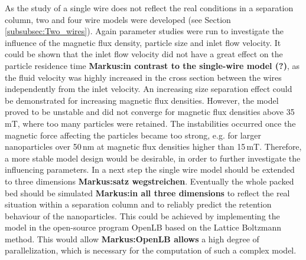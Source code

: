 As the study of a single wire does not reflect the real conditions in a separation column, two and four wire models were developed (see Section \ref{subsubsec:Two_wires}). Again parameter studies were run to investigate the influence of the magnetic flux density, particle size and inlet flow velocity. It could be shown that the inlet flow velocity did not have a great effect on the particle residence time \textbf{Markus:in contrast to the single-wire model (?)}, as the fluid velocity was highly increased in the cross section between the wires independently from the inlet velocity. An increasing size separation effect could be demonstrated for increasing magnetic flux densities. However, the model proved to be unstable and did not converge for magnetic flux densities above 35\,mT, where too many particles were retained. The instabilities occurred once the magnetic force affecting the particles became too strong, e.g. for larger nanoparticles over 50\,nm at magnetic flux densities higher than 15\,mT. Therefore, a more stable model design would be desirable, in order to further investigate the influencing parameters. In a next step the single wire model should be extended to three dimensions \textbf{Markus:satz wegstreichen}. Eventually the whole packed bed should be simulated \textbf{Markus:in all three dimensions} to reflect the real situation within a separation column and to reliably predict the retention behaviour of the nanoparticles. This could be achieved by implementing the model in the open-source program OpenLB based on the Lattice Boltzmann method. This would allow \textbf{Markus:OpenLB allows} a high degree of parallelization, which is necessary for the computation of such a complex model.     

